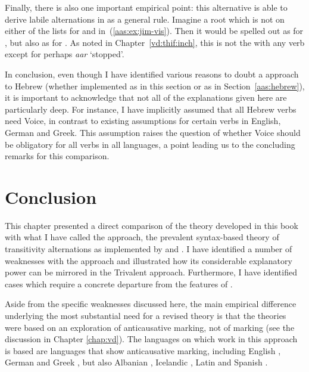 \begin{exe}
\begin{xlist}
\begin{exe}
\begin{exe}
\begin{xlist}
\begin{exe}
\begin{exe}
\begin{exe}
\begin{exe}
\begin{exe}
\begin{xlist}
\begin{exe}
\begin{exe}
\begin{xlist}
\begin{exe}
\begin{xlist}
\begin{exe}
\begin{xlist}
\begin{exe}
\begin{xlist}
Finally, there is also one important empirical point: this alternative is able to derive labile alternations in {\tkal} as a general rule. Imagine a root  which is not on either of the lists for {\vds} and {\vzs} in~(\ref{aas:ex:jim-vis}). Then it would be spelled out as {\tkal} for {\vds}, but also as {\tkal} for {\vzs}. As noted in Chapter~\ref{vd:thif:inch}, this is not the  with any verb except for perhaps \emph{a{\ts}ar} `stopped'.

In conclusion, even though I have identified various reasons to doubt a  approach to Hebrew (whether implemented as in this section or as in Section~\ref{aas:hebrew}), it is important to acknowledge that not all of the explanations given here are particularly deep. For instance, I have implicitly assumed that all Hebrew verbs need Voice, in contrast to existing assumptions for certain verbs in English, German and Greek. This assumption raises the question of whether Voice should be obligatory for all verbs in all languages, a point leading us to the concluding remarks for this comparison.


\section{Conclusion} \label{aas:conc}
This chapter presented a direct comparison of the theory developed in this book with what I have called the  approach, the prevalent syntax-based theory of transitivity alternations as implemented by \cite{schaefer08,schaefer17oup} and \cite{layering15}. I have identified a number of weaknesses with the  approach and illustrated how its considerable explanatory power can be mirrored in the Trivalent approach. Furthermore, I have identified cases which require a concrete departure from the features of .

Aside from the specific weaknesses discussed here, the main empirical difference underlying the most substantial need for a revised theory is that the  theories were based on an exploration of anticausative marking, not of  marking (see the discussion in Chapter \ref{chap:vd}). The languages on which work in this approach is based are languages that show anticausative marking, including English \citep{myler16mit}, German \citep{schaefer17oup} and Greek \citep{spathasetal15}, but also Albanian \citep{kallulli13}, Icelandic \citep{wood15springer}, Latin \citep{embick04,kastnerzu17} and Spanish \citep{schaefervivanco16}.


\end{xlist}
\end{exe}
\end{xlist}
\end{exe}
\end{xlist}
\end{exe}
\end{xlist}
\end{exe}
\end{exe}
\end{xlist}
\end{exe}
\end{exe}
\end{exe}
\end{exe}
\end{exe}
\end{xlist}
\end{exe}
\end{exe}
\end{xlist}
\end{exe}
